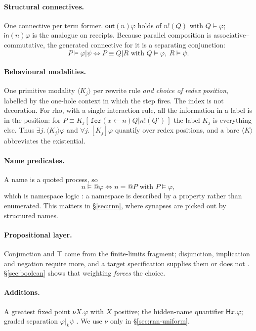 \documentclass[11pt,a4paper]{article}
\theoremstyle{plain}
\theoremstyle{definition}
\theoremstyle{remark}
\newcommand{\rhoc}{\textsf{rho}}
\newcommand{\sepc}{\mathbin{\big|}}
\newcommand{\Hq}{\mathsf{H}}
\newcommand{\out}{\mathsf{out}}
\newcommand{\inn}{\mathsf{in}}
\begin{document}
\paragraph{Structural connectives.} One connective per term former. $\out(n)\varphi$ holds of
$n!(Q)$ with $Q \models \varphi$; $\inn(n)\varphi$ is the analogue on receipts. Because parallel
composition is associative--commutative, the generated connective for it is a separating
conjunction:
\[
P \models \varphi \sepc \psi
\iff
P \equiv Q \sepc R \text{ with } Q \models \varphi,\ R \models \psi .
\]

\paragraph{Behavioural modalities.} One primitive modality $\langle K_j \rangle$ per rewrite rule
\emph{and choice of redex position}, labelled by the one-hole context in which the step fires. The
index is not decoration. For \rhoc, with a single interaction rule, all the information in a label
is in the position: for $P \equiv K_j[\,\texttt{for}(x \leftarrow n)Q \sepc n!(Q')\,]$ the label
$K_j$ is everything else. Thus $\exists j.\,\langle K_j\rangle\varphi$ and
$\forall j.\,[K_j]\varphi$ quantify over redex positions, and a bare $\langle K \rangle$ abbreviates
the existential.

\paragraph{Name predicates.} A name is a quoted process, so
\[
n \models @\varphi \iff n = @P \text{ with } P \models \varphi ,
\]
which is namespace logic \cite{namespace}: a namespace is described by a property rather than
enumerated. This matters in \S\ref{sec:rnn}, where synapses are picked out by structured names.

\paragraph{Propositional layer.} Conjunction and $\top$ come from the finite-limits fragment;
disjunction, implication and negation require more, and a target specification supplies them or does
not \cite{omnibus}. \S\ref{sec:boolean} shows that weighting \emph{forces} the choice.

\paragraph{Additions.} A greatest fixed point $\nu X.\varphi$ with $X$ positive; the hidden-name
quantifier $\Hq x.\varphi$; graded separation $\varphi \sepc_k \psi$ \cite[\S2.3]{classifier}. We
use $\nu$ only in \S\ref{sec:rnn-uniform}.
\end{document}
